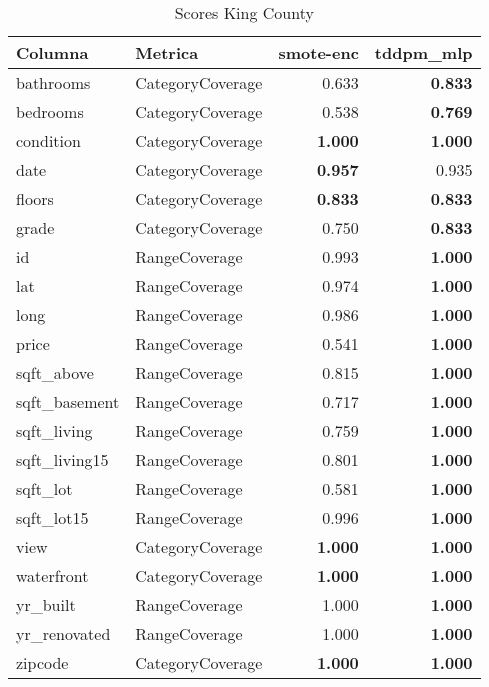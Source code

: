 \begin{table}[H]
\centering
\caption{Scores King County}
\label{table-coverage-king county-a-3}
\begin{tabular}{|l|l|r|r|}
\hline
\rowcolor[gray]{0.8}
Columna & Metrica & smote-enc & tddpm\_mlp \\
\hline bathrooms & CategoryCoverage & 0.633 & \bfseries 0.833 \\
\hline bedrooms & CategoryCoverage & 0.538 & \bfseries 0.769 \\
\hline condition & CategoryCoverage & \bfseries 1.000 & \bfseries 1.000 \\
\hline date & CategoryCoverage & \bfseries 0.957 & 0.935 \\
\hline floors & CategoryCoverage & \bfseries 0.833 & \bfseries 0.833 \\
\hline grade & CategoryCoverage & 0.750 & \bfseries 0.833 \\
\hline id & RangeCoverage & 0.993 & \bfseries 1.000 \\
\hline lat & RangeCoverage & 0.974 & \bfseries 1.000 \\
\hline long & RangeCoverage & 0.986 & \bfseries 1.000 \\
\hline price & RangeCoverage & 0.541 & \bfseries 1.000 \\
\hline sqft\_above & RangeCoverage & 0.815 & \bfseries 1.000 \\
\hline sqft\_basement & RangeCoverage & 0.717 & \bfseries 1.000 \\
\hline sqft\_living & RangeCoverage & 0.759 & \bfseries 1.000 \\
\hline sqft\_living15 & RangeCoverage & 0.801 & \bfseries 1.000 \\
\hline sqft\_lot & RangeCoverage & 0.581 & \bfseries 1.000 \\
\hline sqft\_lot15 & RangeCoverage & 0.996 & \bfseries 1.000 \\
\hline view & CategoryCoverage & \bfseries 1.000 & \bfseries 1.000 \\
\hline waterfront & CategoryCoverage & \bfseries 1.000 & \bfseries 1.000 \\
\hline yr\_built & RangeCoverage & 1.000 & \bfseries 1.000 \\
\hline yr\_renovated & RangeCoverage & 1.000 & \bfseries 1.000 \\
\hline zipcode & CategoryCoverage & \bfseries 1.000 & \bfseries 1.000 \\
\hline
\end{tabular}
\end{table}
